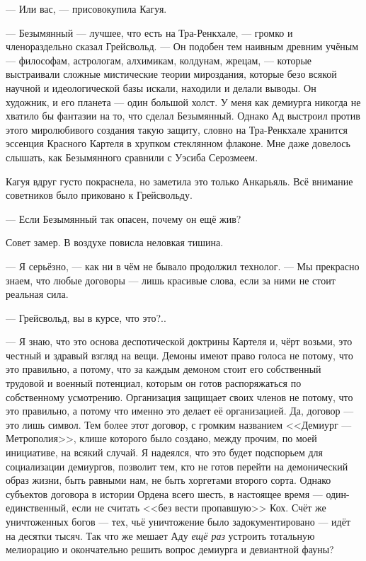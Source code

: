 --- Или вас, --- присовокупила Кагуя.

--- Безымянный --- лучшее, что есть на Тра-Ренкхале, --- громко и членораздельно сказал Грейсвольд.
--- Он подобен тем наивным древним учёным --- философам, астрологам, алхимикам, колдунам, жрецам, --- которые выстраивали сложные мистические теории мироздания, которые безо всякой научной и идеологической базы искали, находили и делали выводы.
Он художник, и его планета --- один большой холст.
У меня как демиурга никогда не хватило бы фантазии на то, что сделал Безымянный.
Однако Ад выстроил против этого миролюбивого создания такую защиту, словно на Тра-Ренкхале хранится эссенция Красного Картеля в хрупком стеклянном флаконе.
Мне даже довелось слышать, как Безымянного сравнили с Уэсиба Серозмеем.

Кагуя вдруг густо покраснела, но заметила это только Анкарьяль.
Всё внимание советников было приковано к Грейсвольду.

--- Если Безымянный так опасен, почему он ещё жив?

Совет замер.
В воздухе повисла неловкая тишина.

--- Я серьёзно, --- как ни в чём не бывало продолжил технолог.
--- Мы прекрасно знаем, что любые договоры --- лишь красивые слова, если за ними не стоит реальная сила.

--- Грейсвольд, вы в курсе, что это?..

--- Я знаю, что это основа деспотической доктрины Картеля и, чёрт возьми, это честный и здравый взгляд на вещи.
Демоны имеют право голоса не потому, что это правильно, а потому, что за каждым демоном стоит его собственный трудовой и военный потенциал, которым он готов распоряжаться по собственному усмотрению.
Организация защищает своих членов не потому, что это правильно, а потому что именно это делает её организацией.
Да, договор --- это лишь символ.
Тем более этот договор, с громким названием <<Демиург --- Метрополия>>, клише которого было создано, между прочим, по моей инициативе, на всякий случай.
Я надеялся, что это будет подспорьем для социализации демиургов, позволит тем, кто не готов перейти на демонический образ жизни, быть равными нам, не быть хоргетами второго сорта.
Однако субъектов договора в истории Ордена всего шесть, в настоящее время --- один-единственный, если не считать <<без вести пропавшую>> Кох.
Счёт же уничтоженных богов --- тех, чьё уничтожение было задокументировано --- идёт на десятки тысяч.
Так что же мешает Аду \emph{ещё раз} устроить тотальную мелиорацию и окончательно решить вопрос демиурга и девиантной фауны?

